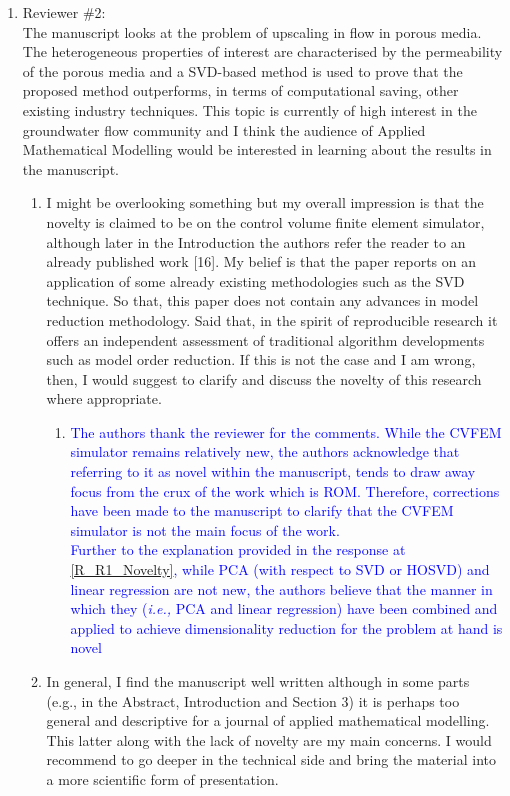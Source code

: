 \documentclass[11pt]{letter} %
\newcommand{\blue}{\textcolor{blue}}
\newcommand{\ie}{{\it i.e., }}
\begin{document}
\begin{letter}
{\begin{enumerate}
\item Reviewer \#2: \\
  The manuscript looks at the problem of upscaling in flow in porous media. The heterogeneous properties of interest are characterised by the permeability of the porous media and a SVD-based method is used to prove that the proposed method outperforms, in terms of computational saving, other existing industry techniques. This topic is currently of high interest in the groundwater flow community and I think the audience of Applied Mathematical Modelling would be interested in learning about the results in the manuscript.
  \begin{enumerate}
  \item \label{R_R2_Novelty} I might be overlooking something but my overall impression is that the novelty is claimed to be on the control volume finite element simulator, although later in the Introduction the authors refer the reader to an already published work [16]. My belief is that the paper reports on an application of some already existing methodologies such as the SVD technique. So that, this paper does not contain any advances in model reduction methodology. Said that, in the spirit of reproducible research it offers an independent assessment of traditional algorithm developments such as model order reduction. If this is not the case and I am wrong, then, I would suggest to clarify and discuss the novelty of this research where appropriate.
    \begin{enumerate}
      \item \label{R_R2_Novelty_1} \blue{The authors thank the reviewer for the comments. While the CVFEM simulator remains relatively new, the authors acknowledge that referring to it as novel within the manuscript, tends to draw away focus from the crux of the work which is ROM. Therefore, corrections have been made to the manuscript to clarify that the CVFEM simulator is not the main focus of the work.\\
Further to the explanation provided in the response at \ref{R_R1_Novelty}, while PCA (with respect to SVD or HOSVD) and linear regression are not new, the authors believe that the manner in which they (\ie PCA and linear regression) have been combined and applied to achieve dimensionality reduction for the problem at hand is novel}
        \end{enumerate}
\item \label{R_R2_TooDesc} In general, I find the manuscript well written although in some parts (e.g., in the Abstract, Introduction and Section 3) it is perhaps too general and descriptive for a journal of applied mathematical modelling. This latter along with the lack of novelty are my main concerns. I would recommend to go deeper in the technical side and bring the material into a more scientific form of presentation.

\end{enumerate}
\end{enumerate}}
\end{letter}
\end{document}
